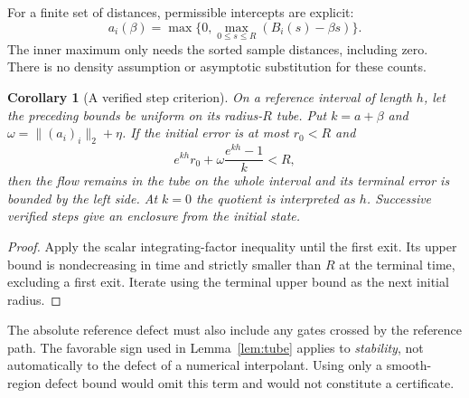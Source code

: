 \documentclass[10pt]{article}
\newtheorem{corollary}[theorem]{Corollary}
\begin{document}
For a finite set of distances, permissible intercepts are explicit:
\[
 a_i(\beta)=\max\big\{0,\max_{0\le s\le R}(B_i(s)-\beta s)\big\}.
\]
The inner maximum only needs the sorted sample distances, including zero.
There is no density assumption or asymptotic substitution for these counts.

\begin{corollary}[A verified step criterion]\label{cor:tube-step}
On a reference interval of length $h$, let the preceding bounds be uniform
on its radius-$R$ tube. Put $k=a+\beta$ and
$\omega=\|(a_i)_i\|_2+\eta$. If the initial error is at most $r_0<R$ and
\[
 e^{kh}r_0+\omega\frac{e^{kh}-1}{k}<R,
\]
then the flow remains in the tube on the whole interval and its terminal
error is bounded by the left side. At $k=0$ the quotient is interpreted as
$h$. Successive verified steps give an enclosure from the initial state.
\end{corollary}
\begin{proof}
Apply the scalar integrating-factor inequality until the first exit. Its
upper bound is nondecreasing in time and strictly smaller than $R$ at the
terminal time, excluding a first exit. Iterate using the terminal upper bound
as the next initial radius.
\end{proof}
The absolute reference defect must also include any gates crossed by the
reference path. The favorable sign used in Lemma~\ref{lem:tube} applies to
\emph{stability}, not automatically to the defect of a numerical interpolant.
Using only a smooth-region defect bound would omit this term and would not
constitute a certificate.
\end{document}
